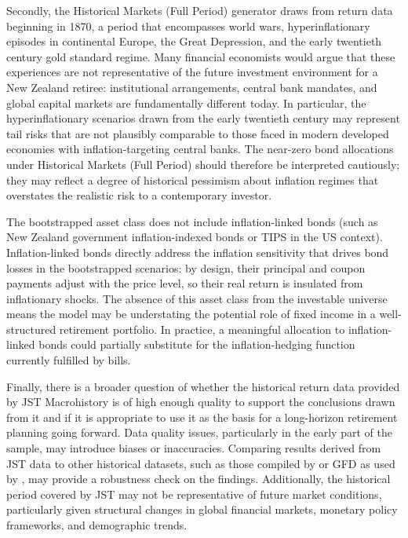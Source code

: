 \documentclass[11pt]{article}
\begin{document}
Secondly, the Historical Markets (Full Period) generator draws from return data beginning in 1870, a period that encompasses world wars, hyperinflationary episodes in continental Europe, the Great Depression, and the early twentieth century gold standard regime. Many financial economists would argue that these experiences are not representative of the future investment environment for a New Zealand retiree: institutional arrangements, central bank mandates, and global capital markets are fundamentally different today. In particular, the hyperinflationary scenarios drawn from the early twentieth century may represent tail risks that are not plausibly comparable to those faced in modern developed economies with inflation-targeting central banks. The near-zero bond allocations under Historical Markets (Full Period) should therefore be interpreted cautiously; they may reflect a degree of historical pessimism about inflation regimes that overstates the realistic risk to a contemporary investor.

The bootstrapped asset class does not include inflation-linked bonds (such as New Zealand government inflation-indexed bonds or TIPS in the US context). Inflation-linked bonds directly address the inflation sensitivity that drives bond losses in the bootstrapped scenarios: by design, their principal and coupon payments adjust with the price level, so their real return is insulated from inflationary shocks. The absence of this asset class from the investable universe means the model may be understating the potential role of fixed income in a well-structured retirement portfolio. In practice, a meaningful allocation to inflation-linked bonds could partially substitute for the inflation-hedging function currently fulfilled by bills.

Finally, there is a broader question of whether the historical return data provided by JST Macrohistory is of high enough quality to support the conclusions drawn from it and if it is appropriate to use it as the basis for a long-horizon retirement planning going forward. Data quality issues, particularly in the early part of the sample, may introduce biases or inaccuracies. Comparing results derived from JST data to other historical datasets, such as those compiled by \textcite{dimson2002triumph} or GFD as used by \textcite{anarkulova2025beyond}, may provide a robustness check on the findings. Additionally, the historical period covered by JST may not be representative of future market conditions, particularly given structural changes in global financial markets, monetary policy frameworks, and demographic trends.
\end{document}
